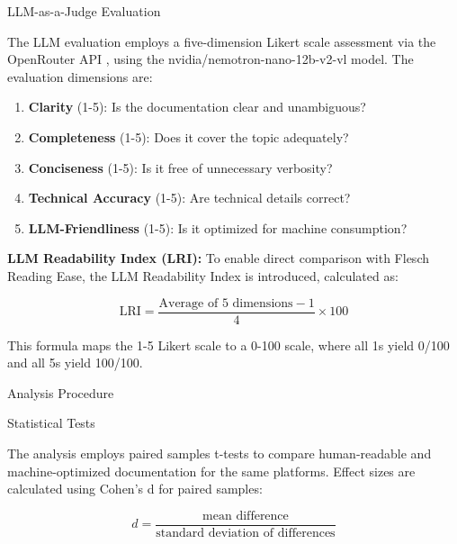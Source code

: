 \documentclass[10pt,conference,a4paper]{IEEEtran}
\makeatletter
\let\oldsubsection\subsection
\let\oldsubsubsection\subsubsection
\renewcommand{\subsection}{%
    \@ifstar{\subsectionStar}{\subsectionNoStar}%
}
\newcommand{\subsectionStar}[1]{%
    \oldsubsection*{\textit{#1}}%
    \vspace{-3pt}%
}
\newcommand{\subsectionNoStar}[1]{%
    \oldsubsection{\textit{#1}}%
    \vspace{-3pt}%
}
\renewcommand{\subsubsection}{%
    \@ifstar{\subsubsectionStar}{\subsubsectionNoStar}%
}
\newcommand{\subsubsectionStar}[1]{%
    \oldsubsubsection*{\textit{#1}}%
}
\newcommand{\subsubsectionNoStar}[1]{%
    \oldsubsubsection{\textit{#1}}%
}
\makeatother
\begin{document}
\subsubsection{LLM-as-a-Judge Evaluation}

The LLM evaluation employs a five-dimension Likert scale assessment via the OpenRouter API \cite{OpenRouter2024}, using the nvidia/nemotron-nano-12b-v2-vl model. The evaluation dimensions are:

\begin{enumerate}
    \item \textbf{Clarity} (1-5): Is the documentation clear and unambiguous?
    \item \textbf{Completeness} (1-5): Does it cover the topic adequately?
    \item \textbf{Conciseness} (1-5): Is it free of unnecessary verbosity?
    \item \textbf{Technical Accuracy} (1-5): Are technical details correct?
    \item \textbf{LLM-Friendliness} (1-5): Is it optimized for machine consumption?
\end{enumerate}

\textbf{LLM Readability Index (LRI):} To enable direct comparison with Flesch Reading Ease, the LLM Readability Index is introduced, calculated as:

\begin{equation}
    \text{LRI} = \frac{\text{Average of 5 dimensions} - 1}{4} \times 100
\end{equation}

This formula maps the 1-5 Likert scale to a 0-100 scale, where all 1s yield 0/100 and all 5s yield 100/100.

\subsection{Analysis Procedure}

\subsubsection{Statistical Tests}

The analysis employs paired samples t-tests to compare human-readable and machine-optimized documentation for the same platforms. Effect sizes are calculated using Cohen's d for paired samples:

\begin{equation}
    d = \frac{\text{mean difference}}{\text{standard deviation of differences}}
\end{equation}
\end{document}
